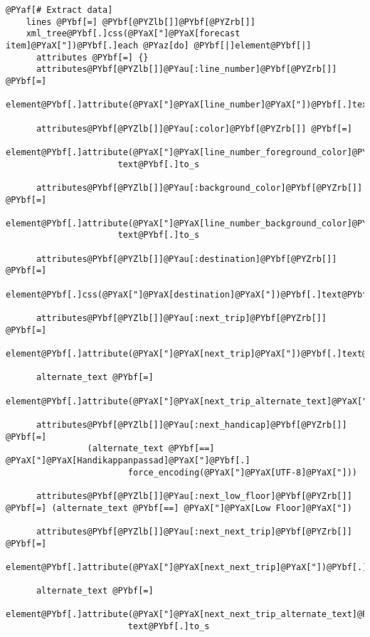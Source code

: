 \begin{Verbatim}[commandchars=@\[\]]
    @PYaf[# Extract data]
    lines @PYbf[=] @PYbf[@PYZlb[]]@PYbf[@PYZrb[]]
    xml_tree@PYbf[.]css(@PYaX["]@PYaX[forecast item]@PYaX["])@PYbf[.]each @PYaz[do] @PYbf[|]element@PYbf[|]
      attributes @PYbf[=] {}
      attributes@PYbf[@PYZlb[]]@PYau[:line_number]@PYbf[@PYZrb[]] @PYbf[=]
                element@PYbf[.]attribute(@PYaX["]@PYaX[line_number]@PYaX["])@PYbf[.]text@PYbf[.]to_s
                
      attributes@PYbf[@PYZlb[]]@PYau[:color]@PYbf[@PYZrb[]] @PYbf[=]
                element@PYbf[.]attribute(@PYaX["]@PYaX[line_number_foreground_color]@PYaX["])@PYbf[.]
                      text@PYbf[.]to_s
                      
      attributes@PYbf[@PYZlb[]]@PYau[:background_color]@PYbf[@PYZrb[]] @PYbf[=]
                element@PYbf[.]attribute(@PYaX["]@PYaX[line_number_background_color]@PYaX["])@PYbf[.]
                      text@PYbf[.]to_s
                      
      attributes@PYbf[@PYZlb[]]@PYau[:destination]@PYbf[@PYZrb[]] @PYbf[=]
                element@PYbf[.]css(@PYaX["]@PYaX[destination]@PYaX["])@PYbf[.]text@PYbf[.]to_s
      
      attributes@PYbf[@PYZlb[]]@PYau[:next_trip]@PYbf[@PYZrb[]] @PYbf[=]
                element@PYbf[.]attribute(@PYaX["]@PYaX[next_trip]@PYaX["])@PYbf[.]text@PYbf[.]to_s
                
      alternate_text @PYbf[=]
                element@PYbf[.]attribute(@PYaX["]@PYaX[next_trip_alternate_text]@PYaX["])@PYbf[.]text@PYbf[.]to_s
                
      attributes@PYbf[@PYZlb[]]@PYau[:next_handicap]@PYbf[@PYZrb[]] @PYbf[=]
                (alternate_text @PYbf[==] @PYaX["]@PYaX[Handikappanpassad]@PYaX["]@PYbf[.]
                        force_encoding(@PYaX["]@PYaX[UTF-8]@PYaX["])) 
                        
      attributes@PYbf[@PYZlb[]]@PYau[:next_low_floor]@PYbf[@PYZrb[]] @PYbf[=] (alternate_text @PYbf[==] @PYaX["]@PYaX[Low Floor]@PYaX["])
      
      attributes@PYbf[@PYZlb[]]@PYau[:next_next_trip]@PYbf[@PYZrb[]] @PYbf[=]
                element@PYbf[.]attribute(@PYaX["]@PYaX[next_next_trip]@PYaX["])@PYbf[.]text@PYbf[.]to_s
                
      alternate_text @PYbf[=] 
                element@PYbf[.]attribute(@PYaX["]@PYaX[next_next_trip_alternate_text]@PYaX["])@PYbf[.]
                        text@PYbf[.]to_s
                        

\end{Verbatim}
